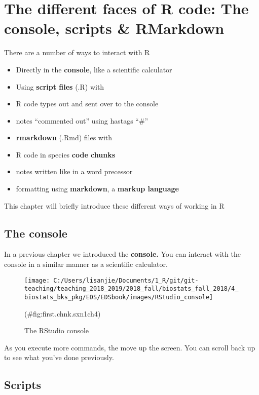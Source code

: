 \documentclass[]{book}
\providecommand{\tightlist}{%
  \setlength{\itemsep}{0pt}\setlength{\parskip}{0pt}}
\theoremstyle{definition}
\theoremstyle{definition}
\theoremstyle{definition}
\theoremstyle{remark}
\begin{document}
\chapter{The different faces of R code: The console, scripts \&
RMarkdown}\label{the-different-faces-of-r-code-the-console-scripts-rmarkdown}

There are a number of ways to interact with R

\begin{itemize}
\tightlist
\item
  Directly in the \textbf{console}, like a scientific calculator
\item
  Using \textbf{script files} (.R) with
\item
  R code types out and sent over to the console
\item
  notes ``commented out'' using hastags ``\#''
\item
  \textbf{rmarkdown} (.Rmd) files with
\item
  R code in species \textbf{code chunks}
\item
  notes written like in a word precessor
\item
  formatting using \textbf{markdown}, a \textbf{markup language}
\end{itemize}

This chapter will briefly introduce these different ways of working in R

\section{The console}\label{the-console}

In a previous chapter we introduced the \textbf{console.} You can
interact with the console in a similar manner as a scientific
calculator.

\begin{figure}
\texttt{[image: C:/Users/lisanjie/Documents/1\_R/git/git-teaching/teaching\_2018\_2019/2018\_fall/biostats\_fall\_2018/4\_biostats\_bks\_pkg/EDS/EDSbook/images/RStudio\_console]} \caption{The RStudio console}(\#fig:first.chnk.sxn1ch4)
\end{figure}

As you execute more commands, the move up the screen. You can scroll
back up to see what you've done previously.

\section{Scripts}\label{scripts}
\end{document}
